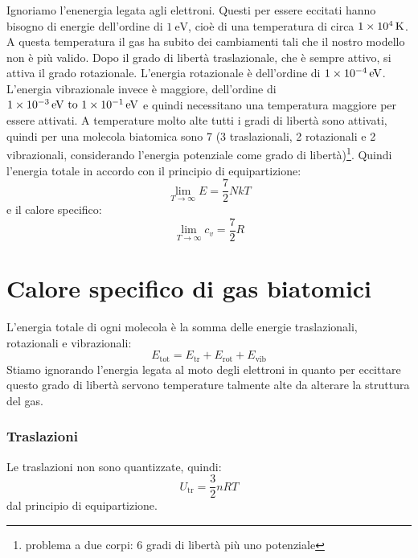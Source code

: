 Ignoriamo l'enenergia legata agli elettroni. Questi per essere eccitati hanno bisogno di energie dell'ordine di $\SI{1}{\electronvolt}$, cioè di una temperatura di circa $\SI{1E4}{\kelvin}$. A questa temperatura il gas ha subito dei cambiamenti tali che il nostro modello non è più valido. Dopo il grado di libertà traslazionale, che è sempre attivo, si attiva il grado rotazionale. L'energia rotazionale è dell'ordine di $\SI{1E-4}{\electronvolt}$. L'energia vibrazionale invece è maggiore, dell'ordine di $\SIrange{1E-3}{1E-1}{\eV}$ e quindi necessitano una temperatura maggiore per essere attivati. A temperature molto alte tutti i gradi di libertà sono attivati, quindi per una molecola biatomica sono 7 (3 traslazionali, 2 rotazionali e 2 vibrazionali, considerando l'energia potenziale come grado di libertà)\footnote{problema a due corpi: 6 gradi di libertà più uno potenziale}. Quindi l'energia totale in accordo con il principio di equipartizione:
\begin{equation}
	\lim_{T\to\infty}E=\frac{7}{2}NkT
\end{equation}
e il calore specifico:
\begin{equation}
	\lim_{T\to\infty}c_v=\frac{7}{2}R
\end{equation}
\section{Calore specifico di gas biatomici}
L'energia totale di ogni molecola è la somma delle energie traslazionali, rotazionali e vibrazionali:
\begin{equation}
	E_\text{tot}=E_\text{tr}+E_\text{rot}+E_\text{vib}
\end{equation}
Stiamo ignorando l'energia legata al moto degli elettroni in quanto per eccittare questo grado di libertà servono temperature talmente alte da alterare la struttura del gas.
\subsubsection{Traslazioni}
Le traslazioni non sono quantizzate, quindi:
\begin{equation}
	U_\text{tr}=\frac{3}{2}nRT
\end{equation}
dal principio di equipartizione.
